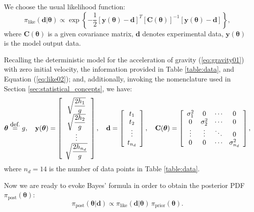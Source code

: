 We choose the usual likelihood function:
\begin{equation}\label{eq:like02}
\pi_{\text{like}}(\mathbf{d} | \boldsymbol{\theta})
\varpropto
\exp
\left\{
-\frac{1}{2}
[\mathbf{y}(\boldsymbol{\theta})-\mathbf{d}]^T
\left[\mathbf{C}(\boldsymbol{\theta})\right]^{-1}
[\mathbf{y}(\boldsymbol{\theta})-\mathbf{d}]
\right\},
\end{equation}
where $\mathbf{C}(\boldsymbol{\theta})$ is a given covariance matrix, $\mathbf{d}$ denotes experimental data, $\mathbf{y}(\boldsymbol{\theta})$ is the model output data.

Recalling the deterministic model for the acceleration of gravity (\ref{eq:gravity01}) with zero initial velocity,  the information provided in Table \ref{table:data}, and Equation (\ref{eq:like02}); and, additionally, invoking the nomenclature used in Section \ref{sec:statistical_concepts}, we have:
\begin{equation}\label{eq:like03}
\boldsymbol{\theta} \stackrel{\text{\small{def.}}}{=} g,
\quad
\mathbf{y}(\boldsymbol{\theta})= 
\left[
\begin{array}{c}
\sqrt{\dfrac{2 h_1}{g}}\\	
\sqrt{\dfrac{2 h_2}{g}}\\	
\vdots\\	
\sqrt{\dfrac{2 h_{n_d}}{g}}
\end{array}
\right],
\quad 
\mathbf{d} = 
\left[
\begin{array}{c}
t_1    \\
t_2    \\ 
\vdots \\	
t_{n_d}
\end{array}
\right],
\quad
\mathbf{C}(\boldsymbol{\theta})=
\left[
\begin{array}{cccc}
\sigma^2_1 & 0	        & \cdots & 0 \\
0          & \sigma^2_2 & \cdots & 0 \\
\vdots     & \vdots     & \ddots & 0 \\
0          & 0          & \cdots & \sigma^2_{n_d}
\end{array}
\right],
\end{equation}
where $n_d=14$ is the number of data points in Table \ref{table:data}.

Now we are ready to evoke Bayes' formula in order to obtain the posterior PDF $\pi_{\text{post}}(\boldsymbol{\theta})$:
\begin{equation}\label{eq-Bayes-g}
\pi_{\text{post}}(\boldsymbol{\theta}|\mathbf{d})\varpropto  \pi_{\text{like}}(\mathbf{d}|\boldsymbol{\theta}) \, \pi_{\text{prior}}(\boldsymbol{\theta}).
\end{equation}


